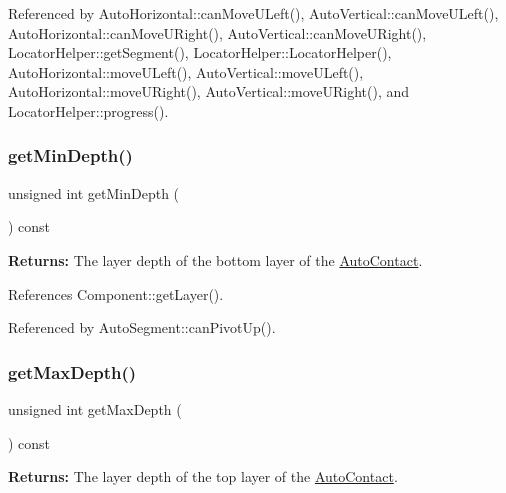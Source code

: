 Referenced by Auto\+Horizontal\+::can\+Move\+U\+Left(), Auto\+Vertical\+::can\+Move\+U\+Left(), Auto\+Horizontal\+::can\+Move\+U\+Right(), Auto\+Vertical\+::can\+Move\+U\+Right(), Locator\+Helper\+::get\+Segment(), Locator\+Helper\+::\+Locator\+Helper(), Auto\+Horizontal\+::move\+U\+Left(), Auto\+Vertical\+::move\+U\+Left(), Auto\+Horizontal\+::move\+U\+Right(), Auto\+Vertical\+::move\+U\+Right(), and Locator\+Helper\+::progress().

\mbox{\label{classKatabatic_1_1AutoContact_ada381cbb88211a7f63d30691b669b5e1}} 
\subsubsection{\texorpdfstring{get\+Min\+Depth()}{getMinDepth()}}
{\footnotesize\ttfamily unsigned int get\+Min\+Depth (\begin{DoxyParamCaption}{ }\end{DoxyParamCaption}) const}

{\bfseries Returns\+:} The layer depth of the bottom layer of the \mbox{\hyperlink{classKatabatic_1_1AutoContact}{Auto\+Contact}}. 

References Component\+::get\+Layer().



Referenced by Auto\+Segment\+::can\+Pivot\+Up().

\mbox{\label{classKatabatic_1_1AutoContact_ac350bb9d2d038287530fcf474987ba55}} 
\subsubsection{\texorpdfstring{get\+Max\+Depth()}{getMaxDepth()}}
{\footnotesize\ttfamily unsigned int get\+Max\+Depth (\begin{DoxyParamCaption}{ }\end{DoxyParamCaption}) const}

{\bfseries Returns\+:} The layer depth of the top layer of the \mbox{\hyperlink{classKatabatic_1_1AutoContact}{Auto\+Contact}}. 

